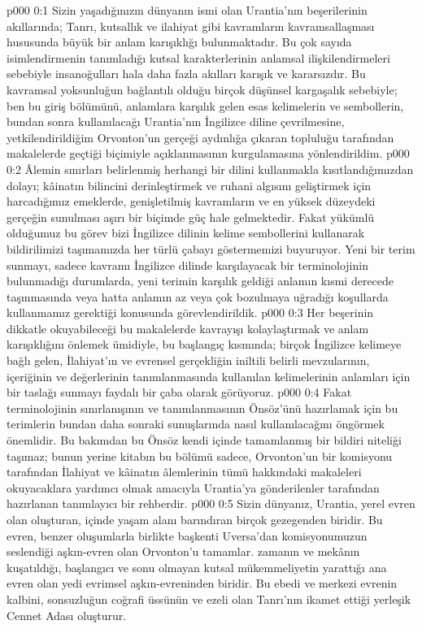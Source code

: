 \uforeword
\vs p000 0:1 Sizin yaşadığınızın dünyanın ismi olan Urantia’nın beşerilerinin akıllarında; Tanrı, kutsallık ve ilahiyat gibi kavramların kavramsallaşması hususunda büyük bir anlam karışıklığı bulunmaktadır. Bu çok sayıda isimlendirmenin tanımladığı kutsal karakterlerinin anlamsal ilişkilendirmeleri sebebiyle insanoğulları hala daha fazla akılları karışık ve kararsızdır. Bu kavramsal yoksunluğun bağlantılı olduğu birçok düşünsel kargaşalık sebebiyle; ben bu giriş bölümünü, anlamlara karşılık gelen esas kelimelerin ve sembollerin, bundan sonra kullanılacağı Urantia’nın İngilizce diline çevrilmesine, yetkilendirildiğim Orvonton’un gerçeği aydınlığa çıkaran topluluğu tarafından makalelerde geçtiği biçimiyle açıklanmasının kurgulamasına yönlendirildim.
\vs p000 0:2 Âlemin sınırları belirlenmiş herhangi bir dilini kullanmakla kısıtlandığımızdan dolayı; kâinatın bilincini derinleştirmek ve ruhani algısını geliştirmek için harcadığımız emeklerde, genişletilmiş kavramların ve en yüksek düzeydeki gerçeğin sunulması aşırı bir biçimde güç hale gelmektedir. Fakat yükümlü olduğumuz bu görev bizi İngilizce dilinin kelime sembollerini kullanarak bildirilimizi taşımamızda her türlü çabayı göstermemizi buyuruyor. Yeni bir terim sunmayı, sadece kavramı İngilizce dilinde karşılayacak bir terminolojinin bulunmadığı durumlarda, yeni terimin karşılık geldiği anlamın kısmi derecede taşınmasında veya hatta anlamın az veya çok bozulmaya uğradığı koşullarda kullanmamız gerektiği konusunda görevlendirildik.
\vs p000 0:3 Her beşerinin dikkatle okuyabileceği bu makalelerde kavrayışı kolaylaştırmak ve anlam karışıklığını önlemek ümidiyle, bu başlangıç kısmında; birçok İngilizce kelimeye bağlı gelen, İlahiyat’ın ve evrensel gerçekliğin iniltili belirli mevzularının, içeriğinin ve değerlerinin tanımlanmasında kullanılan kelimelerinin anlamları için bir taslağı sunmayı faydalı bir çaba olarak görüyoruz.
\vs p000 0:4 Fakat terminolojinin sınırlanışının ve tanımlanmasının Önsöz’ünü hazırlamak için bu terimlerin bundan daha sonraki sunuşlarında nasıl kullanılacağını öngörmek önemlidir. Bu bakımdan bu Önsöz kendi içinde tamamlanmış bir bildiri niteliği taşımaz; bunun yerine kitabın bu bölümü sadece, Orvonton’un bir komisyonu tarafından İlahiyat ve kâinatın âlemlerinin tümü hakkındaki makaleleri okuyacaklara yardımcı olmak amacıyla Urantia’ya gönderilenler tarafından hazırlanan tanımlayıcı bir rehberdir.
\vs p000 0:5 Sizin dünyanız, Urantia, yerel evren olan  oluşturan, içinde yaşam alanı barındıran birçok gezegenden biridir. Bu evren, benzer oluşumlarla birlikte başkenti Uversa’dan komisyonumuzun seslendiği aşkın\hyp{}evren olan Orvonton’u tamamlar.  zamanın ve mekânın kuşatıldığı, başlangıcı ve sonu olmayan kutsal mükemmeliyetin yarattığı ana evren olan  yedi evrimsel aşkın\hyp{}evreninden biridir. Bu ebedi ve merkezi evrenin kalbini, sonsuzluğun coğrafi üssünün ve ezeli olan Tanrı’nın ikamet ettiği yerleşik Cennet Adası oluşturur.
